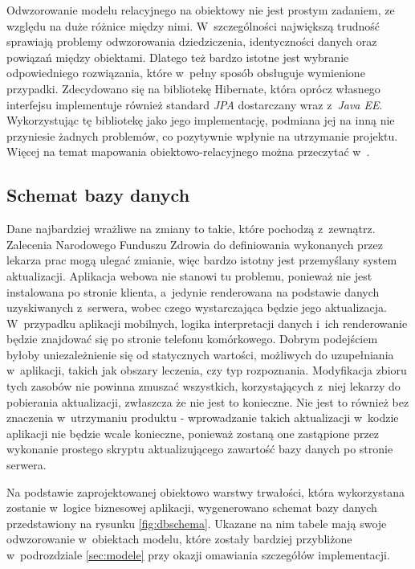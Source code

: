 \documentclass[11pt]{aghdpl}
\begin{document}
Odwzorowanie modelu relacyjnego na obiektowy nie jest prostym zadaniem, ze względu na duże różnice między nimi. W~szczególności największą trudność sprawiają problemy odwzorowania dziedziczenia, identyczności danych oraz powiązań między obiektami. Dlatego też bardzo istotne jest wybranie odpowiedniego rozwiązania, które w~pełny sposób obsługuje wymienione przypadki. Zdecydowano się na bibliotekę Hibernate, która oprócz własnego interfejsu implementuje również standard \emph{JPA} dostarczany wraz z~\emph{Java EE}. Wykorzystując tę bibliotekę jako jego implementację, podmiana jej na inną nie przyniesie żadnych problemów, co pozytywnie wpłynie na utrzymanie projektu. Więcej na temat mapowania obiektowo-relacyjnego można przeczytać w~\cite{HORM}.

\subsection{Schemat bazy danych}

Dane najbardziej wrażliwe na zmiany to takie, które pochodzą z~zewnątrz. Zalecenia Narodowego Funduszu Zdrowia do definiowania wykonanych przez lekarza prac mogą ulegać zmianie, więc bardzo istotny jest przemyślany system aktualizacji. Aplikacja webowa nie stanowi tu problemu, ponieważ nie jest instalowana po stronie klienta, a~jedynie renderowana na podstawie danych uzyskiwanych z~serwera, wobec czego wystarczająca będzie jego aktualizacja. W~przypadku aplikacji mobilnych, logika interpretacji danych i~ich renderowanie będzie znajdować się po stronie telefonu komórkowego. Dobrym podejściem byłoby uniezależnienie się od statycznych wartości, możliwych do uzupełniania w~aplikacji, takich jak obszary leczenia, czy typ rozpoznania. Modyfikacja zbioru tych zasobów nie powinna zmuszać wszystkich, korzystających z~niej lekarzy do pobierania aktualizacji, zwłaszcza że nie jest to konieczne. Nie jest to również bez znaczenia w~utrzymaniu produktu - wprowadzanie takich aktualizacji w~kodzie aplikacji nie będzie wcale konieczne, ponieważ zostaną one zastąpione przez wykonanie prostego skryptu aktualizującego zawartość bazy danych po stronie serwera.

Na podstawie zaprojektowanej obiektowo warstwy trwałości, która wykorzystana zostanie w~logice biznesowej aplikacji, wygenerowano schemat bazy danych przedstawiony na rysunku \ref{fig:dbschema}. Ukazane na nim tabele mają swoje odwzorowanie w~obiektach modelu, które zostały bardziej przybliżone w~podrozdziale \ref{sec:modele} przy okazji omawiania szczegółów implementacji.
\end{document}
